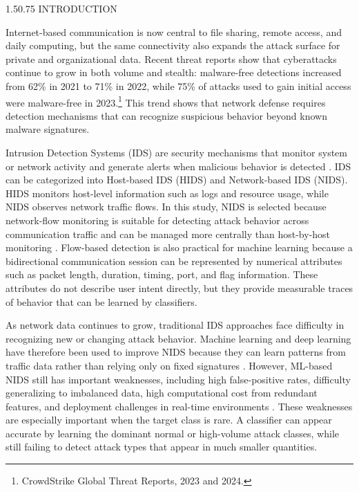 \documentclass[12pt,a4paper]{article}
\makeatletter
\renewcommand{\section}{\@startsection{section}{1}{0pt}%
  {1.5\baselineskip}{0.75\baselineskip}%
  {\normalfont\fontsize{13}{15.6}\selectfont\bfseries}}
\makeatother
\begin{document}
\section{INTRODUCTION}

Internet-based communication is now central to file sharing, remote access, and daily computing, but the same connectivity also expands the attack surface for private and organizational data. Recent threat reports show that cyberattacks continue to grow in both volume and stealth: malware-free detections increased from 62\% in 2021 to 71\% in 2022, while 75\% of attacks used to gain initial access were malware-free in 2023.\footnote{CrowdStrike Global Threat Reports, 2023 and 2024.} This trend shows that network defense requires detection mechanisms that can recognize suspicious behavior beyond known malware signatures.

Intrusion Detection Systems (IDS) are security mechanisms that monitor system or network activity and generate alerts when malicious behavior is detected \parencite{singh2022minority}. IDS can be categorized into Host-based IDS (HIDS) and Network-based IDS (NIDS). HIDS monitors host-level information such as logs and resource usage, while NIDS observes network traffic flows. In this study, NIDS is selected because network-flow monitoring is suitable for detecting attack behavior across communication traffic and can be managed more centrally than host-by-host monitoring \parencite{almuhanna2025anomaly,irfaissurur2025web}. Flow-based detection is also practical for machine learning because a bidirectional communication session can be represented by numerical attributes such as packet length, duration, timing, port, and flag information. These attributes do not describe user intent directly, but they provide measurable traces of behavior that can be learned by classifiers.

As network data continues to grow, traditional IDS approaches face difficulty in recognizing new or changing attack behavior. Machine learning and deep learning have therefore been used to improve NIDS because they can learn patterns from traffic data rather than relying only on fixed signatures \parencite{almuhanna2025anomaly,ahmed2024explainable}. However, ML-based NIDS still has important weaknesses, including high false-positive rates, difficulty generalizing to imbalanced data, high computational cost from redundant features, and deployment challenges in real-time environments \parencite{almuhanna2025anomaly,alsaffar2024shielding,alessa2024hybrid,yang2024imbalanced,prasad2025optimizing}. These weaknesses are especially important when the target class is rare. A classifier can appear accurate by learning the dominant normal or high-volume attack classes, while still failing to detect attack types that appear in much smaller quantities.
\end{document}
